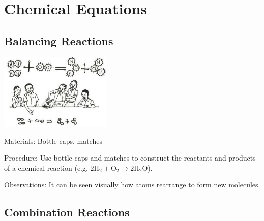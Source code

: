 \section{Chemical Equations}   

\begin{multicols}{2}




\subsection{Balancing Reactions}

\begin{center}
\includegraphics[width=0.4\textwidth]{./img/source/chem-equations.jpg}
\end{center}

\begin{description*}
\item[Materials:]{Bottle caps, matches}
\item[Procedure:]{Use bottle caps and matches to construct the reactants and products of a chemical reaction (e.g. $2\mathrm{H}_2 + \mathrm{O}_2 \longrightarrow 2\mathrm{H}_2\mathrm{O}$). }
\item[Observations:]{It can be seen visually how atoms rearrange to form new molecules.}
\end{description*}

\subsection{Combination Reactions}


\end{multicols}
